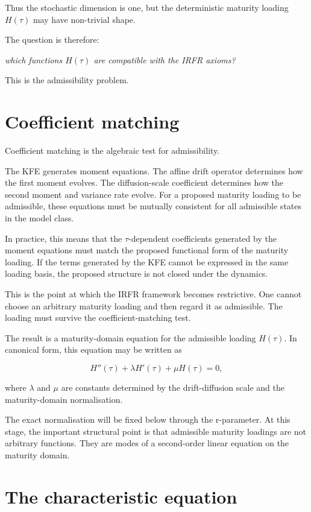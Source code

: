 \documentclass[11pt,oneside]{book}
\begin{document}
Thus the stochastic dimension is one, but the deterministic maturity
loading $H(\tau)$ may have non-trivial shape.

The question is therefore:

\begin{center}\emph{which functions \(H(\tau)\) are compatible with the IRFR axioms?}\end{center}
This is the admissibility problem.

\section{Coefficient matching}\label{coefficient-matching}

Coefficient matching is the algebraic test for admissibility.

The KFE generates moment equations. The affine drift operator determines
how the first moment evolves. The diffusion-scale coefficient determines
how the second moment and variance rate evolve. For a proposed maturity
loading to be admissible, these equations must be mutually consistent
for all admissible states in the model class.

In practice, this means that the $\tau$-dependent coefficients generated by
the moment equations must match the proposed functional form of the
maturity loading. If the terms generated by the KFE cannot be expressed
in the same loading basis, the proposed structure is not closed under
the dynamics.

This is the point at which the IRFR framework becomes restrictive. One
cannot choose an arbitrary maturity loading and then regard it as
admissible. The loading must survive the coefficient-matching test.

The result is a maturity-domain equation for the admissible loading
$H(\tau)$. In canonical form, this equation may be written as

\[
H''(\tau) + \lambda H'(\tau) + \mu H(\tau) = 0,
\]

where $\lambda$ and $\mu$ are constants determined by the drift-diffusion scale and
the maturity-domain normalisation.

The exact normalisation will be fixed below through the r-parameter. At
this stage, the important structural point is that admissible maturity
loadings are not arbitrary functions. They are modes of a second-order
linear equation on the maturity domain.

\section{The characteristic
equation}\label{the-characteristic-equation}
\end{document}
